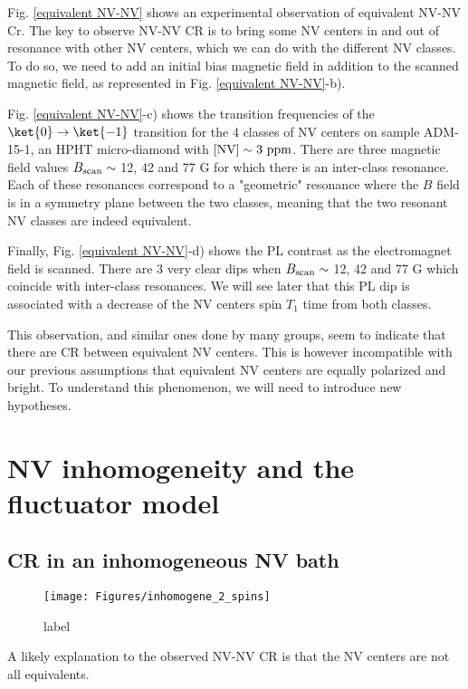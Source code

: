 \documentclass[a4paper,11pt]{report}
\begin{document}
Fig. \ref{equivalent NV-NV} shows an experimental observation of equivalent NV-NV Cr. The key to observe NV-NV CR is to bring some NV centers in and out of resonance with other NV centers, which we can do with the different NV classes. To do so, we need to add an initial bias magnetic field in addition to the scanned magnetic field, as represented in Fig. \ref{equivalent NV-NV}-b). %

Fig. \ref{equivalent NV-NV}-c) shows the transition frequencies of the $\ket{0}\to\ket{-1}$ transition for the 4 classes of NV centers on sample ADM-15-1, an HPHT micro-diamond with $[\rm NV]\sim 3\ \rm ppm$. There are three magnetic field values $B_{\rm scan} \sim$ 12, 42 and 77 G for which there is an inter-class resonance. Each of these resonances correspond to a "geometric" resonance where the $B$ field is in a symmetry plane between the two classes, meaning that the two resonant NV classes are indeed equivalent.

Finally, Fig. \ref{equivalent NV-NV}-d) shows the PL contrast as the electromagnet field is scanned. There are 3 very clear dips when $B_{\rm scan} \sim$ 12, 42 and 77 G which coincide with inter-class resonances. We will see later that this PL dip is associated with a decrease of the NV centers spin $T_1$ time from both classes.

This observation, and similar ones done by many groups, seem to indicate that there are CR between equivalent NV centers. This is however incompatible with our previous assumptions that equivalent NV centers are equally polarized and bright. To understand this phenomenon, we will need to introduce new hypotheses.

\section{NV inhomogeneity and the fluctuator model}

\subsection{CR in an inhomogeneous NV bath}
\begin{figure}[h]
\centering
\texttt{[image: Figures/inhomogene\_2\_spins]}
\caption{label}
\label{inhomogene}
\end{figure}
A likely explanation to the observed NV-NV CR is that the NV centers are not all equivalents.
\end{document}
